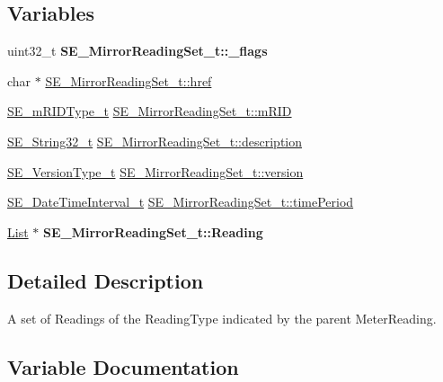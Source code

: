 \subsection*{Variables}
\begin{DoxyCompactItemize}
\item 
\mbox{\label{group__MirrorReadingSet_ga53101ed8f088890d87ce1e4b9523f7d6}} 
uint32\+\_\+t {\bfseries S\+E\+\_\+\+Mirror\+Reading\+Set\+\_\+t\+::\+\_\+flags}
\item 
char $\ast$ \hyperlink{group__MirrorReadingSet_ga122a57ae501a13ce4ccb4b5f38348080}{S\+E\+\_\+\+Mirror\+Reading\+Set\+\_\+t\+::href}
\item 
\hyperlink{group__mRIDType_gac74622112f3a388a2851b2289963ba5e}{S\+E\+\_\+m\+R\+I\+D\+Type\+\_\+t} \hyperlink{group__MirrorReadingSet_gab69106935620c1870a127bf728635d02}{S\+E\+\_\+\+Mirror\+Reading\+Set\+\_\+t\+::m\+R\+ID}
\item 
\hyperlink{group__String32_gac9f59b06b168b4d2e0d45ed41699af42}{S\+E\+\_\+\+String32\+\_\+t} \hyperlink{group__MirrorReadingSet_gac4687cbf3cafae738001cac3eb928727}{S\+E\+\_\+\+Mirror\+Reading\+Set\+\_\+t\+::description}
\item 
\hyperlink{group__VersionType_ga4b8d27838226948397ed99f67d46e2ae}{S\+E\+\_\+\+Version\+Type\+\_\+t} \hyperlink{group__MirrorReadingSet_gaea484e4cf9496a9f98da29f0759831c0}{S\+E\+\_\+\+Mirror\+Reading\+Set\+\_\+t\+::version}
\item 
\hyperlink{structSE__DateTimeInterval__t}{S\+E\+\_\+\+Date\+Time\+Interval\+\_\+t} \hyperlink{group__MirrorReadingSet_gad45245dcd90b290a44555565a335aa64}{S\+E\+\_\+\+Mirror\+Reading\+Set\+\_\+t\+::time\+Period}
\item 
\mbox{\label{group__MirrorReadingSet_gacc7d4a4f842172a9d10967185163ced2}} 
\hyperlink{structList}{List} $\ast$ {\bfseries S\+E\+\_\+\+Mirror\+Reading\+Set\+\_\+t\+::\+Reading}
\end{DoxyCompactItemize}


\subsection{Detailed Description}
A set of Readings of the Reading\+Type indicated by the parent Meter\+Reading. 

\subsection{Variable Documentation}
\mbox{\label{group__MirrorReadingSet_gac4687cbf3cafae738001cac3eb928727}} 
